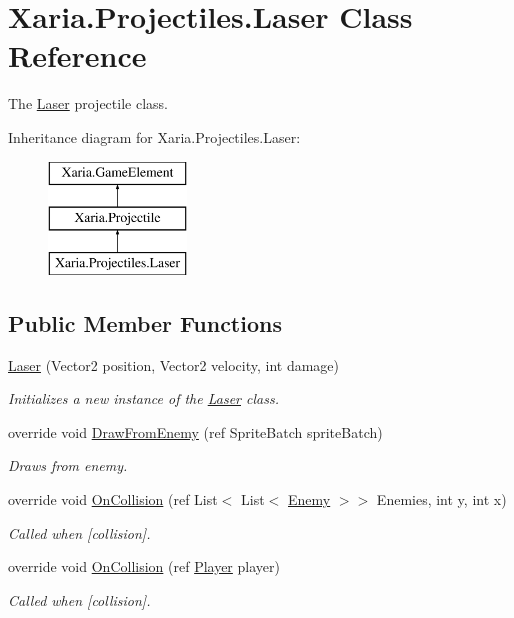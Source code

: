 \hypertarget{classXaria_1_1Projectiles_1_1Laser}{}\section{Xaria.\+Projectiles.\+Laser Class Reference}
\label{classXaria_1_1Projectiles_1_1Laser}


The \hyperlink{classXaria_1_1Projectiles_1_1Laser}{Laser} projectile class.  


Inheritance diagram for Xaria.\+Projectiles.\+Laser\+:\begin{figure}[H]
\begin{center}
\leavevmode
\includegraphics[height=3.000000cm]{classXaria_1_1Projectiles_1_1Laser}
\end{center}
\end{figure}
\subsection*{Public Member Functions}
\begin{DoxyCompactItemize}
\item 
\hyperlink{classXaria_1_1Projectiles_1_1Laser_a9ee8ad23d0355112d7470b2dbadb6f05}{Laser} (Vector2 position, Vector2 velocity, int damage)
\begin{DoxyCompactList}\small\item\em Initializes a new instance of the \hyperlink{classXaria_1_1Projectiles_1_1Laser}{Laser} class. \end{DoxyCompactList}\item 
override void \hyperlink{classXaria_1_1Projectiles_1_1Laser_a8ce585ff80044654b9c697c30cb9b1c2}{Draw\+From\+Enemy} (ref Sprite\+Batch sprite\+Batch)
\begin{DoxyCompactList}\small\item\em Draws from enemy. \end{DoxyCompactList}\item 
override void \hyperlink{classXaria_1_1Projectiles_1_1Laser_ae28f7334f6bebf40c613162b2ba9896a}{On\+Collision} (ref List$<$ List$<$ \hyperlink{classXaria_1_1Enemy}{Enemy} $>$$>$ Enemies, int y, int x)
\begin{DoxyCompactList}\small\item\em Called when \mbox{[}collision\mbox{]}. \end{DoxyCompactList}\item 
override void \hyperlink{classXaria_1_1Projectiles_1_1Laser_a0a306ff1779560ed3fec771709182eb5}{On\+Collision} (ref \hyperlink{classXaria_1_1Player}{Player} player)
\begin{DoxyCompactList}\small\item\em Called when \mbox{[}collision\mbox{]}. \end{DoxyCompactList}\end{DoxyCompactItemize}
